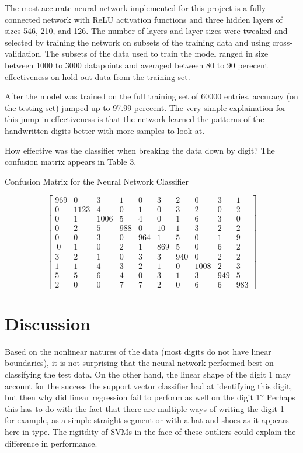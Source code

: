 \documentclass{article}
\begin{document}
The most accurate neural network implemented for this project is a fully-connected network with ReLU activation functions and three hidden layers of sizes 546, 210, and 126. The number of layers and layer sizes were tweaked and selected by training the network on subsets of the training data and using cross-validation. The subsets of the data used to train the model ranged in size between 1000 to 3000 datapoints and averaged between 80 to 90 perecent effectiveness on hold-out data from the training set. 

After the model was trained on the full training set of 60000 entries, accuracy (on the testing set) jumped up to 97.99 perecent. The very simple explaination for this jump in effectiveness is that the network learned the patterns of the handwritten digits better with more samples to look at. 

How effective was the classifier when breaking the data down by digit? The confusion matrix appears in Table 3.
\begin{table}
  \caption{Confusion Matrix for the Neural Network Classifier}
  \label{sample-table}
  \centering
$$\left[\begin{array}{cccccccccc} 969 &    0  &  3&    1&    0&    3  &  2&    0&    3  &  1\\
    0& 1123 &   4&    0&    1 &   0 &   3 &   2 &   0 &   2\\
    0 &   1& 1006 &   5 &   4 &   0 &   1 &   6 &   3 &   0\\
    0 &   2&    5&  988 &   0 &  10&    1 &   3 &   2 &   2\\
    0  &  0 &   3  &  0 & 964 &   1&    5  &  0  &  1  &  9\\\
    0 &   1  &  0  &  2  &  1 & 869 &   5 &   0  &  6 &   2\\
    3   & 2 &   1&    0  &  3  &  3 & 940 &   0  &  2 &   2\\
    1   & 1 &   4 &   3&    2 &   1 &   0& 1008 &   2 &   3\\
    5   & 5 &   6 &   4  &  0  &  3 &   1  &  3 & 949  &  5\\
    2  &  0 &   0 &   7 &   7  &  2  &  0 &   6 &   6 & 983 \end{array} \right] $$

\end{table}

\section{Discussion} Based on the nonlinear natures of the data (most digits do not have linear boundaries), it is not surprising that the neural network performed best on classifying the test data. On the other hand, the linear shape of the digit 1 may account for the success the support vector classifier had at identifying this digit, but then why did linear regression fail to perform as well on the digit 1? Perhaps this has to do with the fact that there are multiple ways of writing the digit 1 - for example, as a simple straight segment or with a hat and shoes as it appears here in type. The rigitdity of SVMs in the face of these outliers could explain the difference in performance.
\end{document}
